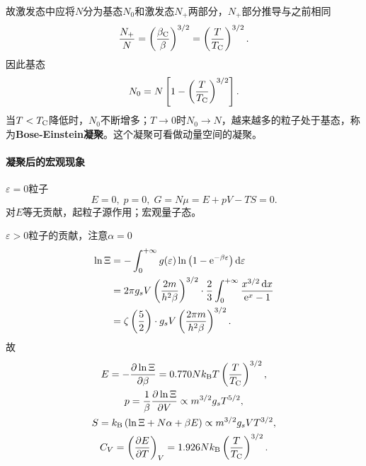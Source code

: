 故激发态中应将$N$分为基态$N_0$和激发态$N_+$两部分，$N_+$部分推导与之前相同
\[
	\frac{N_+}N=\left(\frac{\beta_\mathrm C}\beta\right)^{3/2}=\left(\frac T{T_\mathrm C}\right)^{3/2}.
\]
因此基态
\begin{align}
	N_0=N\left[1-\left(\frac T{T_\mathrm C}\right)^{3/2}\right].
\end{align}
当$T<T_\mathrm C$降低时，$N_0$不断增多；$T\to 0$时$N_0\to N$，越来越多的粒子处于基态，称为\textbf{Bose-Einstein凝聚}。这个凝聚可看做动量空间的凝聚。

\paragraph*{凝聚后的宏观现象}$\varepsilon=0$粒子
\[
	E=0,\;p=0,\;G=N\mu=E+pV-TS=0.
\]
对$E$等无贡献，起粒子源作用；宏观量子态。

$\varepsilon>0$粒子的贡献，注意$\alpha=0$
\begin{align}\notag
	\ln\Xi&=-\int\zti g(\varepsilon)\ln\kh{1-\e{-\beta\varepsilon}}\d\varepsilon\\\notag
	&=2\pi g_sV\kh{\frac{2m}{h^2\beta}}^{3/2}\cdot\frac23\int\zti\frac{x^{3/2}\d x}{\e x-1}\\
	&=\zeta\kh{\frac52}\cdot g_sV\kh{\frac{2\pi m}{h^2\beta}}^{3/2}.%
\end{align}
故
\begin{gather}
	E=-\pv{\ln\Xi}\beta=0.770N\kB T\kh{\frac T{T_\crt}}^{3/2},\\
	p=\frac1\beta\pv{\ln\Xi}V\propto m^{3/2}g_sT^{5/2},\\
	S=\kB\kh{\ln\Xi+N\alpha+\beta E}\propto m^{3/2}g_sVT^{3/2},\\
	C_V=\kh{\pv ET}_V=1.926N\kB\kh{\frac T{T_\crt}}^{3/2}.
\end{gather}
